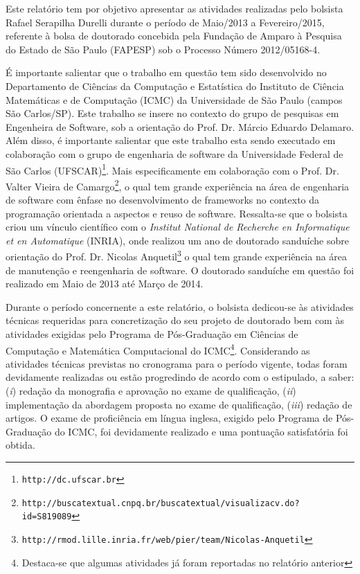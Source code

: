  Este relatório tem por objetivo apresentar as atividades realizadas pelo bolsista Rafael Serapilha Durelli durante o período de Maio/2013 a Fevereiro/2015,
 referente à bolsa de doutorado concebida pela Fundação de Amparo à Pesquisa do Estado de São Paulo (FAPESP) sob o Processo Número 2012/05168-4. 
 
 É importante salientar que o trabalho em questão tem sido desenvolvido no Departamento de Ciências da Computação e Estatística do Instituto de Ciência 
 Matemáticas e de Computação (ICMC) da Universidade de São Paulo (campos São Carlos/SP).  
 Este trabalho se insere no contexto do grupo de pesquisas em Engenheira de Software, sob a orientação do Prof. Dr. Márcio Eduardo Delamaro.
 Além disso, é importante salientar que este trabalho esta sendo executado em colaboração com o grupo de engenharia de software da Universidade Federal de São Carlos (UFSCAR)\footnote{\texttt{http://dc.ufscar.br}}.  
 Mais especificamente em colaboração com o Prof. Dr. Valter Vieira de Camargo\footnote{\texttt{http://buscatextual.cnpq.br/buscatextual/visualizacv.do?id=S819089}},
 o qual tem grande experiência na área de engenharia de software com ênfase no desenvolvimento de frameworks no contexto da programação orientada a aspectos e reuso de software.  Ressalta-se que o bolsista criou um vínculo científico com o \textit{Institut National de Recherche en Informatique et en Automatique} (INRIA),  
onde realizou um ano de doutorado sanduíche sobre orientação do  
 Prof. Dr. Nicolas Anquetil\footnote{\texttt{http://rmod.lille.inria.fr/web/pier/team/Nicolas-Anquetil}} o qual tem grande experiência na área de manutenção e reengenharia de software. O doutorado sanduíche em questão foi realizado em Maio de 2013 até Março de 2014.

Durante o período concernente a este relatório, o bolsista dedicou-se às atividades técnicas requeridas para concretização do seu projeto de doutorado bem com às atividades exigidas pelo Programa de Pós-Graduação em Ciências de Computação e Matemática Computacional do ICMC\footnote{Destaca-se que algumas atividades já foram reportadas no relatório anterior}. Considerando as atividades técnicas previstas no cronograma para o período vigente, todas foram devidamente realizadas ou estão progredindo de acordo com o estipulado, a saber: (\textit{i}) redação da monografia e aprovação no exame de qualificação, (\textit{ii}) implementação da abordagem proposta no exame de qualificação, (\textit{iii}) redação de artigos. O exame de proficiência em língua inglesa, exigido pelo Programa de Pós-Graduação do ICMC, foi devidamente realizado e uma pontuação satisfatória foi obtida.


